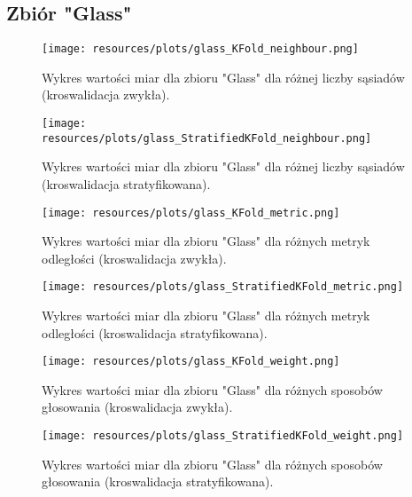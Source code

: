 \subsection{Zbiór "Glass"}
    \begin{figure}[H]
        \center
        \texttt{[image: resources/plots/glass\_KFold\_neighbour.png]}
        \caption{Wykres wartości miar dla zbioru "Glass" dla różnej liczby sąsiadów (kroswalidacja zwykła).}
    \end{figure}

    \begin{figure}[H]
        \center
        \texttt{[image: resources/plots/glass\_StratifiedKFold\_neighbour.png]}
        \caption{Wykres wartości miar dla zbioru "Glass" dla różnej liczby sąsiadów (kroswalidacja stratyfikowana).}
    \end{figure}

    \pagebreak

    \begin{figure}[H]
        \center
        \texttt{[image: resources/plots/glass\_KFold\_metric.png]}
        \caption{Wykres wartości miar dla zbioru "Glass" dla różnych metryk odległości (kroswalidacja zwykła).}
    \end{figure}

    \begin{figure}[H]
        \center
        \texttt{[image: resources/plots/glass\_StratifiedKFold\_metric.png]}
        \caption{Wykres wartości miar dla zbioru "Glass" dla różnych metryk odległości (kroswalidacja stratyfikowana).}
    \end{figure}

    \pagebreak

    \begin{figure}[H]
        \center
        \texttt{[image: resources/plots/glass\_KFold\_weight.png]}
        \caption{Wykres wartości miar dla zbioru "Glass" dla różnych sposobów głosowania (kroswalidacja zwykła).}
    \end{figure}

    \begin{figure}[H]
        \center
        \texttt{[image: resources/plots/glass\_StratifiedKFold\_weight.png]}
        \caption{Wykres wartości miar dla zbioru "Glass" dla różnych sposobów głosowania (kroswalidacja stratyfikowana).}
    \end{figure}
